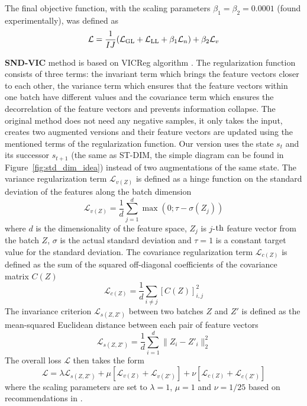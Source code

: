 \documentclass[a4paper,11pt]{elsarticle}
\begin{document}
The final objective function, with the scaling parameters $\beta_{1}=\beta_{2}=0.0001$ (found experimentally), was defined as
\begin{equation}
\label{eq:sndsd6}
\mathcal{L} = \frac{1}{I J} (\mathcal{L}_{\rm GL} + \mathcal{L}_{\rm LL} + \beta_{1} \mathcal{L}_{n}) + \beta_{2} \mathcal{L}_{v}
\end{equation}

\textbf{SND-VIC} method is based on VICReg algorithm \citep{Bardes2022}. The regularization function consists of three terms: the invariant term which brings the feature vectors closer to each other, the variance term which ensures that the feature vectors within one batch have different values and the covariance term which ensures the decorrelation of the feature vectors and prevents information collapse. The original method does not need any negative samples, it only takes the input, creates two augmented versions and their feature vectors are updated using the mentioned terms of the regularization function. Our version uses the state $s_t$ and its successor $s_{t+1}$ (the same as ST-DIM, the simple diagram can be found in Figure~\ref{fig:std_dim_idea}) instead of two augmentations of the same state.
The variance regularization term $\mathcal{L}_{v(Z)}$ is defined as a hinge function on the standard deviation of the features along the batch dimension
\begin{equation}
\label{eq:sndvic1}
\mathcal{L}_{v(Z)} = \frac{1}{d} \sum_{j=1}^{d} \max(0; \tau - \sigma(Z_j)) 
\end{equation}
where $d$ is the dimensionality of the feature space, $Z_{j}$ is $j$-${\rm th}$ feature vector from the batch $Z$, $\sigma$ is the actual standard deviation and $\tau = 1$ is a constant target value for the standard deviation. The covariance regularization term $\mathcal{L}_{c(Z)}$ is defined as the sum of the squared off-diagonal coefficients of the covariance matrix $C(Z)$
\begin{equation}
\label{eq:sndvic2}
\mathcal{L}_{c(Z)} = \frac{1}{d} \sum_{i\neq j} [C(Z)]^{2}_{i,j}
\end{equation}
The invariance criterion $\mathcal{L}_{s(Z,Z')}$ between two batches $Z$ and $Z'$ is defined as the mean-squared Euclidean distance between each pair of feature vectors
\begin{equation}
\label{eq:sndvic3}
\mathcal{L}_{s(Z, Z')} = \frac{1}{d}\sum_{i = 1}^{d}\|Z_i - Z'_i\|^2_{2}
\end{equation}
The overall loss $\mathcal{L}$ then takes the form
\begin{equation}
\label{eq:sndvic4}
\mathcal{L} = \lambda \mathcal{L}_{s(Z, Z')} + \mu \left[\mathcal{L}_{v(Z)} + \mathcal{L}_{v(Z')}\right] + \nu \left[\mathcal{L}_{c(Z)} + \mathcal{L}_{c(Z')}\right]
\end{equation}
where the scaling parameters are set to $\lambda=1$, $\mu=1$ and $\nu=1/25$ based on recommendations in \cite{Bardes2022}.
\end{document}
